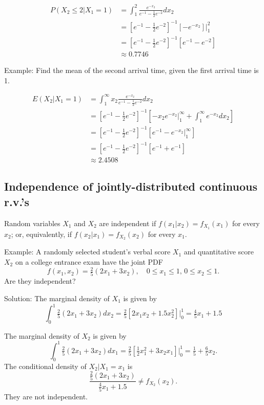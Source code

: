 \documentclass[
]{book}
\begin{document}
\begin{align*}
P(X_2\leq 2|X_1=1) &= \int_{1}^2 \frac{e^{-x_2}}{e^{-1}-\tfrac12 e^{-2}}dx_2\\
&= [e^{-1}-\tfrac12 e^{-2}]^{-1}[-e^{-x_2}]|_1^2\\
& = [e^{-1}-\tfrac12 e^{-2}]^{-1}[e^{-1}-e^{-2}]\\
& \approx 0.7746
\end{align*}

Example: Find the mean of the second arrival time, given the first arrival time is 1.

\begin{align*}
E(X_2|X_1=1) &= \int_{1}^\infty x_2\frac{e^{-x_2}}{e^{-1}-\tfrac12 e^{-2}}dx_2\\
& = [e^{-1}-\tfrac12 e^{-2}]^{-1} [-x_2e^{-x_2}|_1^\infty+\int_1^\infty e^{-x_2}dx_2]\\
& = [e^{-1}-\tfrac12 e^{-2}]^{-1} [e^{-1} - e^{-x_2}|_1^\infty]\\
& = [e^{-1}-\tfrac12 e^{-2}]^{-1} [e^{-1} + e^{-1}]\\
&\approx 2.4508
\end{align*}

\hypertarget{independence-of-jointly-distributed-continuous-r.v.s}{%
\subsection{Independence of jointly-distributed continuous r.v.'s}\label{independence-of-jointly-distributed-continuous-r.v.s}}

Random variables \(X_1\) and \(X_2\) are independent if \(f(x_1|x_2) = f_{X_1}(x_1)\) for every \(x_2\); or, equivalently, if \(f(x_2|x_1) = f_{X_2}(x_2)\) for every \(x_1\).

Example: A randomly selected student's verbal score \(X_1\) and quantitative score \(X_2\) on a college entrance exam have the joint PDF
\[f(x_1, x_2) = \tfrac25 (2x_1+3x_2), \quad 0\leq x_1\leq 1, \, 0\leq x_2\leq 1.\]
Are they independent?

Solution:
The marginal density of \(X_1\) is given by
\[\int_{0}^1 \tfrac25 (2x_1+3x_2)dx_2 = \tfrac25[2x_1x_2+1.5x_2^2]|_0^1 = \tfrac45 x_1 + 1.5\]

The marginal density of \(X_2\) is given by
\[\int_{0}^1 \tfrac25 (2x_1+3x_2)dx_1 = \tfrac25[\tfrac12x_1^2+3x_2x_1]|_0^1 = \tfrac15  + \tfrac65 x_2.\]
The conditional density of \(X_2|X_1=x_1\) is
\[\frac{\tfrac25(2x_1+3x_2)}{\tfrac45 x_1+1.5} \ne f_{X_2}(x_2).\]
They are not independent.

  
\end{document}
